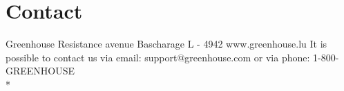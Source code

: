 \section{Contact}
\label{sec:Contact}
Greenhouse Resistance avenue\newline
Bascharage L - 4942\newline
www.greenhouse.lu\newline
It is possible to contact us via email: support@greenhouse.com or via phone: 1-800-GREENHOUSE 
\\*